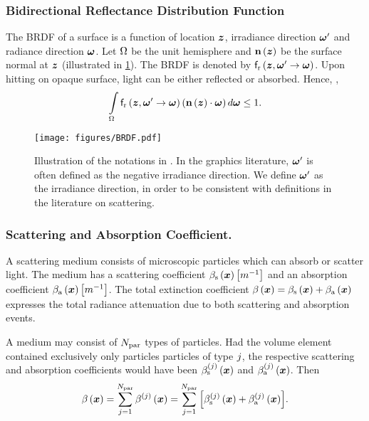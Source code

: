 \documentclass{article}
\begin{document}
\subsubsection{Bidirectional Reflectance Distribution Function}
The \ac{BRDF} of a surface is a function of location $\boldsymbol{z}$, irradiance direction $\boldsymbol{\omega}'$ and radiance direction $\boldsymbol{\omega}$. Let $\Omega$ be the unit hemisphere and $\textbf{n}\left({\boldsymbol{z}}\right)$ be the surface normal at $\boldsymbol{z}$ (illustrated in \fig\ref{fig:BRDF}). The \ac{BRDF} is denoted by $\mathsf{f}_{\text{r}}\left({\boldsymbol{z}, \boldsymbol{\omega}'\rightarrow\boldsymbol{\omega}}\right)$.  Upon hitting on opaque surface, light can be either reflected or absorbed. Hence, \citep{veach1997robust},
\begin{equation}
\label{eq:brdf_conservation}
\intop_\hemisphere \brdf\regpar{\locationc, \direction'\rightarrow\direction}\regpar{\normal\regpar{\locationc} \cdot \direction}d\direction \leq 1.
\end{equation}

\begin{figure}[t]
  \centering
  \texttt{[image: figures/BRDF.pdf]}
    \caption{Illustration of the notations in \eq{\ref{eq:brdf_conservation}}. In the graphics literature, $\boldsymbol{\omega}'$ is often defined as the negative irradiance direction. We define $\boldsymbol{\omega}'$ as the irradiance direction, in order to be consistent with definitions in the literature on scattering.}
    \label{fig:BRDF}
\end{figure}

\subsubsection{Scattering and Absorption Coefficient.}
A scattering medium consists of microscopic particles which can absorb or scatter light. The medium has a scattering coefficient $\beta_{\text{s}}\left({\boldsymbol{x}}\right)\left[{m^{-1}}\right]$ and an absorption coefficient $\beta_{\text{a}}\left({\boldsymbol{x}}\right)\left[{m^{-1}}\right]$. The total extinction coefficient $\beta\left({\boldsymbol{x}}\right)=\beta_{\text{s}}\left({\boldsymbol{x}}\right)+\beta_{\text{a}}\left({\boldsymbol{x}}\right)$ expresses the total radiance attenuation due to both scattering and absorption events. 

A medium may consist of $N_{\text{par}}$ types of particles. Had the volume element contained exclusively only particles particles of type $j$, the respective scattering and absorption coefficients would have been $\beta_{\text{s}}^{\left({j}\right)}\left({\boldsymbol{x}}\right)$ and $\beta_{\text{a}}^{\left({j}\right)}\left({\boldsymbol{x}}\right)$. Then  
\begin{equation}
\label{eq:ext_particles}
\beta\left({\boldsymbol{x}}\right)=\sum_{j=1}^{N_{\text{par}}}{\beta^{\left({j}\right)}\left({\boldsymbol{x}}\right)}= \sum_{j=1}^{N_{\text{par}}}{\left[{\beta_{\text{s}}^{\left({j}\right)}\left({\boldsymbol{x}}\right)+\beta_{\text{a}}^{\left({j}\right)}\left({\boldsymbol{x}}\right)}\right]}.
\end{equation}
\end{document}
